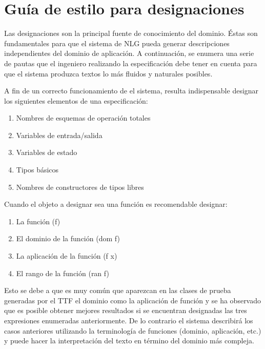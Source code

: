 \chapter{Guía de estilo para designaciones}
\label{ape:designaciones}

Las designaciones son la principal fuente de conocimiento del dominio. Éstas son fundamentales para que el sistema de NLG pueda generar descripciones independientes del dominio de aplicación. A continuación, se enumera una serie de pautas que el ingeniero realizando la especificación debe tener en cuenta para que el sistema produzca textos lo más fluidos y naturales posibles.

\bigskip
A fin de un correcto funcionamiento de el sistema, resulta indispensable designar los siguientes elementos de una especificación:

\bigskip
\begin{enumerate}
	\item Nombres de esquemas de operación totales
	\item Variables de entrada/salida
	\item Variables de estado
	\item Tipos básicos
	\item Nombres de constructores de tipos libres
\end{enumerate}

\bigskip
Cuando el objeto a designar sea una función es recomendable designar:

\bigskip
\begin{enumerate}
	\item La función (f)
	\item El dominio de la función (dom f)
	\item La aplicación de la función (f x)
	\item El rango de la función (ran f)
\end{enumerate}

\bigskip
Esto se debe a que es muy común que aparezcan en las clases de prueba generadas por el TTF el dominio como la aplicación de función y se ha observado que es posible obtener mejores resultados si se encuentran designadas las tres expresiones enumeradas anteriormente. De lo contrario el sistema describirá los casos anteriores utilizando la terminología de funciones (dominio, aplicación, etc.) y puede hacer la interpretación del texto en término del dominio más compleja.
